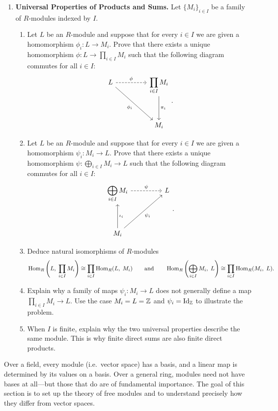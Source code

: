 \documentclass[12pt,reqno]{amsart}
\begin{document}
\begin{enumerate}[leftmargin=*, resume=problems]
\item \textbf{Universal Properties of Products and Sums.} Let $\{M_{i}\}_{i\in I}$ be a family of $R$-modules indexed by $I$. 
    \begin{enumerate}
    \item Let $L$ be an $R$-module and suppose that for every $i\in I$ we are given a homomorphism $\phi_i:L\to M_i$. Prove that there exists a unique homomorphism $\phi:L\to \prod_{i\in I}M_i$ such that the following diagram commutes for all $i\in I$:
    \[
    \begin{tikzcd}[row sep = 3.5em, column sep = 4.5em]
    L \arrow[r, dashed, "\phi"] \arrow[dr, swap, "\phi_i"] & \displaystyle \prod_{i \in I} M_{i} \arrow[d, "\pi_i"] \\
    & M_{i}
	\end{tikzcd}.
	\]
    \item Let $L$ be an $R$-module and suppose that for every $i\in I$ we are given a homomorphism $\psi_i:M_i\to L$. Prove that there exists a unique homomorphism $\psi:\bigoplus_{i\in I} M_{i} \to L$ such that the following diagram commutes for all $i\in I$:
    \[
    \begin{tikzcd}[row sep = 3.5em, column sep = 4.5em]
    \displaystyle \bigoplus_{i\in I} M_{i} \arrow[r, dashed, "\psi"] & L\\
    M_{i} \arrow[u, swap, "\iota_{i}"] \arrow[ur, swap, "\psi_{i}"]&
	\end{tikzcd}.
	\]
    \item Deduce natural isomorphisms of $R$-modules
    \[
    \operatorname{Hom}_R\left(L, \; \prod_{i\in I}M_i\right)\cong \prod_{i\in I}\operatorname{Hom}_R(L,\; M_i)
    \quad \quad \text{and} \quad \quad 
    \operatorname{Hom}_R\left(\bigoplus_{i\in I}M_i,\; L\right)\cong \prod_{i\in I}\operatorname{Hom}_R(M_i,\; L).
    \]
    \item Explain why a family of maps $\psi_i:M_i\to L$ does not generally define a map $\prod_{i \in I} M_i\to L$. Use the case $M_i=L=\mathbb{Z}$ and $\psi_i=\operatorname{Id}_{\mathbb{Z}}$ to illustrate the problem.
    \item When $I$ is finite, explain why the two universal properties describe the same module. This is why finite direct sums are also finite direct products.
    \end{enumerate}
\end{enumerate}

\hrulefill

Over a field, every module (i.e.\ vector space) has a basis, and a linear map is determined by its values on a basis. Over a general ring, modules need not have bases at all---but those that do are of fundamental importance. The goal of this section is to set up the theory of free modules and to understand precisely how they differ from vector spaces.
  
\end{document}
